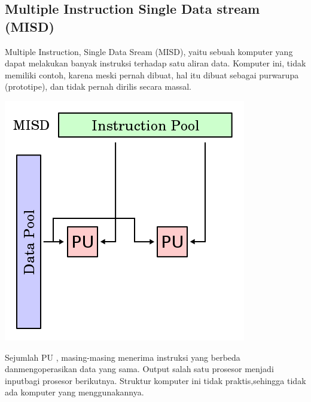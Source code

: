 \documentclass[a4paper,12pt]{article}
\begin{document}
\subsection{Multiple Instruction Single Data stream (MISD)}
Multiple Instruction, Single Data Sream (MISD), yaitu sebuah komputer yang dapat melakukan banyak instruksi terhadap satu aliran data. Komputer ini, tidak memiliki contoh, karena meski pernah dibuat, hal itu dibuat sebagai purwarupa (prototipe), dan tidak pernah dirilis secara massal.
\begin{center}
    \includegraphics[width=0.8\linewidth]{misd.png}
\end{center}
Sejumlah PU , masing-masing menerima instruksi yang berbeda danmengoperasikan data yang sama.
Output salah satu prosesor menjadi inputbagi prosesor berikutnya.
Struktur komputer ini tidak praktis,sehingga tidak ada komputer yang menggunakannya.
\end{document}
